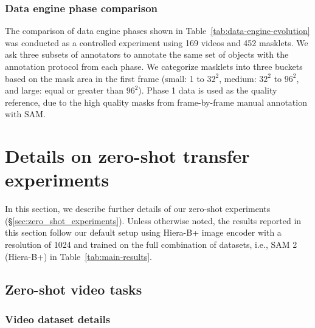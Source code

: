 \documentclass[]{fairmeta}
\newcommand{\secref}[1]{\S\ref{#1}}
\newcommand{\tabref}[1]{Table~\ref{#1}}
\begin{document}
\subsubsection{Data engine phase comparison} \label{sec:data_engine_phase_comp} The comparison of data engine phases shown in \tabref{tab:data-engine-evolution} was conducted as a controlled experiment using 169 videos and 452 masklets. We ask three subsets of annotators to annotate the same set of objects with the annotation protocol from each phase. We categorize masklets into three buckets based on the mask area in the first frame (small: 1 to $32^2$, medium: $32^2$ to $96^2$, and large: equal or greater than $96^2$). Phase 1 data is used as the quality reference, due to the high quality masks from frame-by-frame manual annotation with SAM.



\section{Details on zero-shot transfer experiments}
\label{sec:supp_eval_sz}

In this section, we describe further details of our zero-shot experiments (\secref{sec:zero_shot_experiments}). 
Unless otherwise noted, the results reported in this section follow our default setup using Hiera-B+ image encoder with a resolution of 1024 and trained on the full combination of datasets, i.e., SAM 2 (Hiera-B+) in \tabref{tab:main-results}.

\subsection{Zero-shot video tasks}
\label{sec:supp_eval_sz_video}

\subsubsection{Video dataset details} 
\label{sec:supp_eval_sz_video_datasets}
\end{document}
